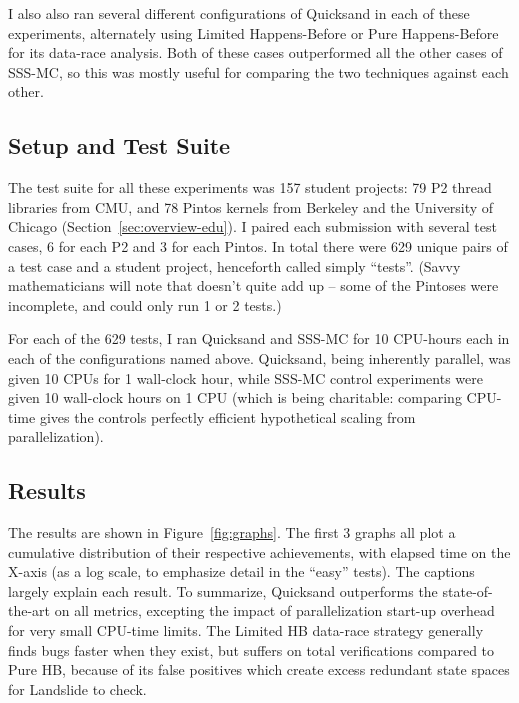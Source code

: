 I also also ran several different configurations of Quicksand in each of these experiments,
alternately using Limited Happens-Before or Pure Happens-Before for its data-race analysis.
Both of these cases outperformed all the other cases of SSS-MC, so this was mostly useful for comparing the two techniques against each other.

\subsection{Setup and Test Suite}

The test suite for all these experiments was 157 student projects: 79 P2 thread libraries from CMU, and 78 Pintos kernels from Berkeley and the University of Chicago (Section~\ref{sec:overview-edu}).
I paired each submission with several test cases, 6 for each P2 and 3 for each Pintos.
In total there were 629 unique pairs of a test case and a student project, henceforth called simply ``tests''.
(Savvy mathematicians will note that doesn't quite add up -- some of the Pintoses were incomplete, and could only run 1 or 2 tests.)

For each of the 629 tests, I ran Quicksand and SSS-MC for 10 CPU-hours each in each of the configurations named above.
Quicksand, being inherently parallel, was given 10 CPUs for 1 wall-clock hour,
while SSS-MC control experiments were given 10 wall-clock hours on 1 CPU
(which is being charitable: comparing CPU-time gives the controls perfectly efficient hypothetical scaling from parallelization).

\subsection{Results}

The results are shown in Figure~\ref{fig:graphs}.
The first 3 graphs all plot a cumulative distribution of their respective achievements,
with elapsed time on the X-axis (as a log scale, to emphasize detail in the ``easy'' tests).
The captions largely explain each result.
To summarize, Quicksand outperforms the state-of-the-art on all metrics, excepting the impact of parallelization start-up overhead for very small CPU-time limits.
The Limited HB data-race strategy generally finds bugs faster when they exist,
but suffers on total verifications compared to Pure HB,
because of its false positives which create excess redundant state spaces for Landslide to check.

